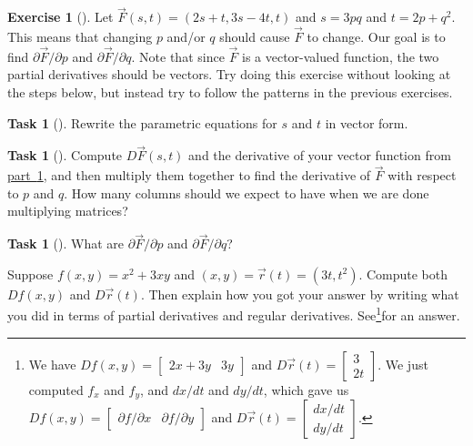 \documentclass[10pt,]{book}
\theoremstyle{plain}
\theoremstyle{definition}
\theoremstyle{definition}
\theoremstyle{definition}
\theoremstyle{definition}
\newtheorem{exploration}[project]{Exercise}
\newtheorem{task}[project]{Task}
\theoremstyle{definition}
\numberwithin{equation}{section}
\newcommand{\amp}{&}
\begin{document}
\begin{exploration}[]\label{exploration-156}
Let \(\vec F(s,t) = (2s+t,3s-4t,t)\) and \(s=3pq\) and \(t=2p+q^2\). This means that changing \(p\) and/or \(q\) should cause \(\vec F\) to change. Our goal is to find \(\partial \vec F/\partial p\) and \(\partial \vec F/\partial q\). Note that since \(\vec F\) is a vector-valued function, the two partial derivatives should be vectors. Try doing this exercise without looking at the steps below, but instead try to follow the patterns in the previous exercises.%
\begin{task}[]\label{item_3}
Rewrite the parametric equations for \(s\) and \(t\) in vector form.%
\end{task}
\begin{task}[]\label{task-365}
Compute \(D\vec F(s,t)\) and the derivative of your vector function from \hyperref[item_3]{part~\ref{item_3}}, and then multiply them together to find the derivative of \(\vec F\) with respect to \(p\) and \(q\).  How many columns should we expect to have when we are done multiplying matrices?%
\end{task}
\begin{task}[]\label{task-366}
What are \(\partial \vec F/\partial p\) and \(\partial \vec F/\partial q\)?%
\end{task}
\end{exploration}
Suppose \(f(x,y)=x^2+3xy\) and \((x,y) = \vec r(t) = (3t,t^2)\). Compute both \(Df(x,y)\) and \(D\vec r(t)\). Then explain how you got your answer by writing what you did in terms of partial derivatives and regular derivatives. See\footnote{We have \(Df(x,y) = \begin{bmatrix}2x+3y\amp 3y
\end{bmatrix}\) and \(D\vec r(t) = \begin{bmatrix}3\\2t
\end{bmatrix}\). We just computed \(f_x\) and \(f_y\), and \(dx/dt\) and \(dy/dt\), which gave us \(Df(x,y) = \begin{bmatrix}\partial f/\partial x\amp \partial f/\partial y
\end{bmatrix}\) and \(D\vec r(t) = \begin{bmatrix}dx/dt\\dy/dt
\end{bmatrix}\).\label{fn-4}}for an answer.%
\end{document}
